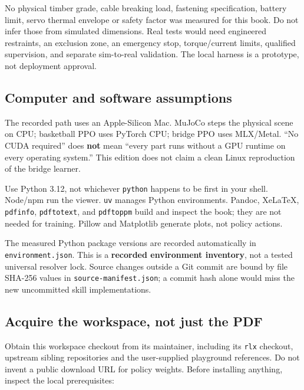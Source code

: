 \documentclass[
  american,
  11pt,
  letterpaper,
]{article}
\begin{document}
No physical timber grade, cable breaking load, fastening specification,
battery limit, servo thermal envelope or safety factor was measured for
this book. Do not infer those from simulated dimensions. Real tests
would need engineered restraints, an exclusion zone, an emergency stop,
torque/current limits, qualified supervision, and separate sim-to-real
validation. The local harness is a prototype, not deployment approval.

\subsection{Computer and software
assumptions}\label{computer-and-software-assumptions}

The recorded path uses an Apple-Silicon Mac. MuJoCo steps the physical
scene on CPU; basketball PPO uses PyTorch CPU; bridge PPO uses
MLX/Metal. ``No CUDA required'' does \textbf{not} mean ``every part runs
without a GPU runtime on every operating system.'' This edition does not
claim a clean Linux reproduction of the bridge learner.

Use Python 3.12, not whichever \texttt{python} happens to be first in
your shell. Node/npm run the viewer. \texttt{uv} manages Python
environments. Pandoc, XeLaTeX, \texttt{pdfinfo}, \texttt{pdftotext}, and
\texttt{pdftoppm} build and inspect the book; they are not needed for
training. Pillow and Matplotlib generate plots, not policy actions.

The measured Python package versions are recorded automatically in
\texttt{environm\allowbreak{}ent.json\allowbreak{}}. This is a
\textbf{recorded environment inventory}, not a tested universal resolver
lock. Source changes outside a Git commit are bound by file SHA-256
values in \texttt{source-\allowbreak{}manifest\allowbreak{}.json}; a
commit hash alone would miss the new uncommitted skill implementations.

\subsection{Acquire the workspace, not just the
PDF}\label{acquire-the-workspace-not-just-the-pdf}

Obtain this workspace checkout from its maintainer, including its
\texttt{rlx} checkout, upstream sibling repositories and the
user-supplied playground references. Do not invent a public download URL
for policy weights. Before installing anything, inspect the local
prerequisites:
\end{document}
